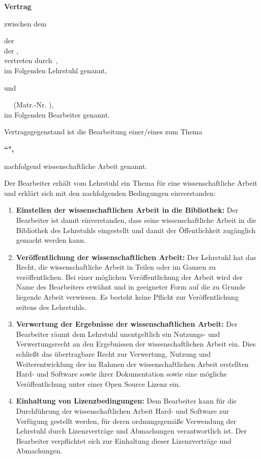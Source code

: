 \documentclass[german,11pt,a4paper]{netforms}
\begin{document}
\netformheader

\textbf{\LARGE Vertrag}

\vskip2.5mm
zwischen dem

\vskip2mm
\hfill\begin{minipage}{.9\textwidth}
\chair{} der\\
\school{} der \orgname,\\
vertreten durch\
\chairhead,\\
im Folgenden \glqq{}Lehrstuhl\grqq{} genannt,
\end{minipage}

\vskip2mm
und

\vskip2mm
\hfill\begin{minipage}{.9\textwidth}
\theanrede\ \thevorname\
\textbf{\thenachname} (Matr.-Nr. \thematrikel),\\
im Folgenden \glqq{}Bearbeiter\grqq{} genannt.
\end{minipage}

\vskip5mm
Vertragsgegenstand ist die Bearbeitung einer/eines \textbf{\thetype} zum Thema
\begin{center}
	\bfseries ``\thetitleenglish",
\end{center}
nachfolgend \glqq{}wissenschaftliche Arbeit\grqq{} genannt.

\vskip5mm
Der Bearbeiter erh\"alt vom Lehrstuhl ein Thema f\"ur eine wissenschaftliche
Arbeit und erkl\"art sich mit den nachfolgenden Bedingungen einverstanden:
\begin{enumerate}
	\item \textbf{Einstellen der wissenschaftlichen Arbeit in die Bibliothek:}
	Der Bearbeiter ist damit einverstanden, dass seine wissenschaftliche Arbeit
	in die Bibliothek des Lehrstuhls eingestellt und damit der \"Offentlichkeit
	zug\"anglich gemacht werden kann.
	\item \textbf{Ver\"offentlichung der wissenschaftlichen Arbeit:}
	Der Lehrstuhl hat das Recht, die wissenschaftliche Arbeit in Teilen oder im
	Ganzen zu ver\"offentlichen.
	Bei einer m\"oglichen Ver\"offentlichung der Arbeit wird der Name des
	Bearbeiters erw\"ahnt und in geeigneter Form auf die zu Grunde liegende
	Arbeit verwiesen.
	Es besteht keine Pflicht zur Ver\"offentlichung seitens des Lehrstuhls.
	\item \textbf{Verwertung der Ergebnisse der wissenschaftlichen Arbeit:}
	Der Bearbeiter r\"aumt dem Lehrstuhl unentgeltlich ein Nutzungs- und
	Verwertungsrecht an den Ergebnissen der wissenschaftlichen Arbeit ein.
	Dies schlie\ss{}t das \"ubertragbare Recht zur Verwertung, Nutzung und
	Weiterentwicklung der im Rahmen der wissenschaftlichen Arbeit erstellten
	Hard- und Software sowie ihrer Dokumentation sowie eine m\"ogliche
	Ver\"offentlichung unter einer Open Source Lizenz ein.
	\item \textbf{Einhaltung von Lizenzbedingungen:}
	Dem Bearbeiter kann f\"ur die Durchf\"uhrung der wissenschaftlichen Arbeit
	Hard- und Software zur Verf\"ugung gestellt werden, f\"ur deren
	ordnungsgem\"a\ss{}e Verwendung der Lehrstuhl durch Lizenzvertr\"age und
	Abmachungen verantwortlich ist.
	Der Bearbeiter verpflichtet sich zur Einhaltung dieser Lizenzvertr\"age und
	Abmachungen.
\end{enumerate}
\end{document}
